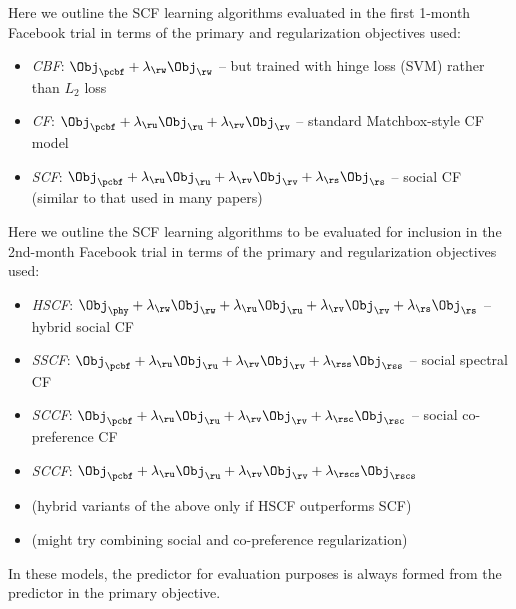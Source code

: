 Here we outline the SCF learning algorithms evaluated in the first
1-month Facebook trial in terms of
the primary and regularization objectives used:
\begin{itemize}
\item {\it CBF}: $\Obj_\pcbf + \lambda_\rw \Obj_\rw$ -- but trained with hinge loss (SVM) rather than $L_2$ loss
\item {\it CF}: $\Obj_\pcbf + \lambda_\ru \Obj_\ru + \lambda_\rv \Obj_\rv$ -- standard Matchbox-style CF model
\item {\it SCF}: $\Obj_\pcbf + \lambda_\ru \Obj_\ru + \lambda_\rv \Obj_\rv + \lambda_\rs \Obj_\rs$ -- social CF (similar to that used in many papers)
\end{itemize}

Here we outline the SCF learning algorithms to be evaluated for inclusion
in the 2nd-month Facebook trial in terms of
the primary and regularization objectives used:
\begin{itemize}
\item {\it HSCF}: $\Obj_\phy + \lambda_\rw \Obj_\rw + \lambda_\ru \Obj_\ru + \lambda_\rv \Obj_\rv + \lambda_\rs \Obj_\rs$ -- hybrid social CF
\item {\it SSCF}: $\Obj_\pcbf + \lambda_\ru \Obj_\ru + \lambda_\rv \Obj_\rv + \lambda_\rss \Obj_\rss$ -- social spectral CF
\item {\it SCCF}: $\Obj_\pcbf + \lambda_\ru \Obj_\ru + \lambda_\rv \Obj_\rv + \lambda_\rsc \Obj_\rsc$ -- social co-preference CF
\item {\it SCCF}: $\Obj_\pcbf + \lambda_\ru \Obj_\ru + \lambda_\rv \Obj_\rv + \lambda_\rscs \Obj_\rscs$
\item (hybrid variants of the above only if HSCF outperforms SCF)
\item (might try combining social and co-preference regularization)
\end{itemize}
In these models, the predictor for evaluation purposes is always
formed from the predictor in the primary objective.


